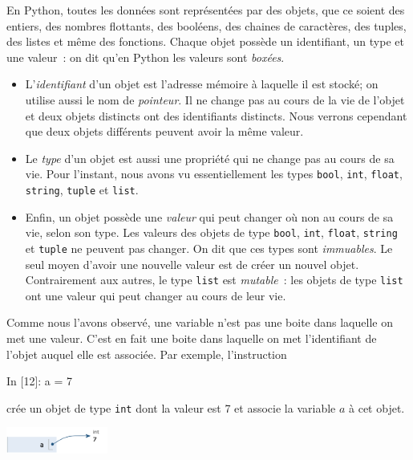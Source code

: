 \documentclass{magnoliaold}
\begin{document}
En Python, toutes les données sont représentées par des objets, que ce soient des entiers, des nombres
flottants, des booléens, des chaines de caractères, des tuples, des listes et même des fonctions. Chaque
objet possède un identifiant, un type et une valeur~: on dit qu'en Python les valeurs sont \emph{boxées}.
\begin{itemize}
\item L'\emph{identifiant} d'un objet est l'adresse mémoire à laquelle il est stocké; on utilise aussi
  le nom de \emph{pointeur}. Il ne change pas au cours de la vie de l'objet et deux objets
  distincts ont des identifiants distincts. Nous verrons cependant que deux objets différents peuvent
  avoir la même valeur.
\item Le \emph{type} d'un objet est aussi une propriété qui ne change pas au cours de sa vie. Pour l'instant, nous
  avons vu essentiellement les types \verb!bool!, \verb!int!, \verb!float!, \verb!string!, \verb!tuple! et \verb!list!.
\item Enfin, un objet possède une \emph{valeur} qui peut changer où non au cours de sa vie, selon son type.
  Les valeurs des objets de type \verb_bool_, \verb_int_, \verb_float_, \verb_string_ et \verb!tuple! ne peuvent
  pas changer. On dit que ces types sont \emph{immuables}. Le seul moyen d'avoir une nouvelle valeur est de
  créer un nouvel objet. Contrairement aux autres, le type \verb!list! est \emph{mutable}~: les objets
  de type \verb!list! ont une valeur qui peut changer au cours de leur vie.
\end{itemize}

\vspace{2ex}
Comme nous l'avons observé, une variable n'est pas une boite dans laquelle on met une valeur.
C'est en fait une boite dans laquelle on met l'identifiant de l'objet auquel elle est associée. Par exemple,
l'instruction

\begin{pythoncode}
In [12]: a = 7
\end{pythoncode} 
\noindent
crée un objet de type \verb_int_ dont la valeur est 7 et associe la variable $a$ à cet objet.

\begin{center}
\includegraphics[width=0.25\textwidth]{../../commun/images/python-cours-tutor-1}
\end{center}
\end{document}
